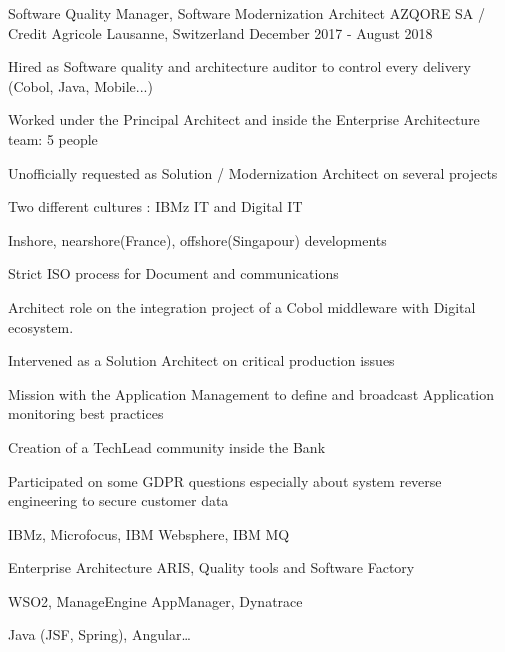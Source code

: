 \begin{cventries}
{{\begin{cvitems}
            \end{cvitems}
        }
    }
    \cventry
    {Software Quality Manager, Software Modernization Architect} %
    {AZQORE SA / Credit Agricole} %
    {Lausanne, Switzerland} %
    {December 2017 - August 2018} %
    {
        \experience
        {
            \begin{cvitems} %
                \item{Hired as Software quality and architecture auditor to control every delivery (Cobol, Java, Mobile...)}
                \item{Worked under the Principal Architect and inside the Enterprise Architecture team: 5 people}
                \item{Unofficially requested as Solution / Modernization Architect on several projects}                
                \item{Two different cultures : IBMz IT and Digital IT}
                \item{Inshore, nearshore(France), offshore(Singapour) developments}
                \item{Strict ISO process for Document and communications}
            \end{cvitems}
        }
        {
           \begin{cvitems} %
                \item{Architect role on the integration project of a Cobol middleware with Digital ecosystem.}
                \item{Intervened as a Solution Architect on critical production issues}
                \item{Mission with the Application Management to define and broadcast Application monitoring best practices}
                \item{Creation of a TechLead community inside the Bank}
                \item{Participated on some GDPR questions especially about system reverse engineering to secure customer data}
            \end{cvitems}
        }
        {
            \begin{cvitems} %
                \item{IBMz, Microfocus, IBM Websphere, IBM MQ}
                \item{Enterprise Architecture ARIS, Quality tools and Software Factory}
                \item{WSO2, ManageEngine AppManager, Dynatrace}
                \item{Java (JSF, Spring), Angular}\dots
            \end{cvitems}
        }
    }


\end{cventries}
